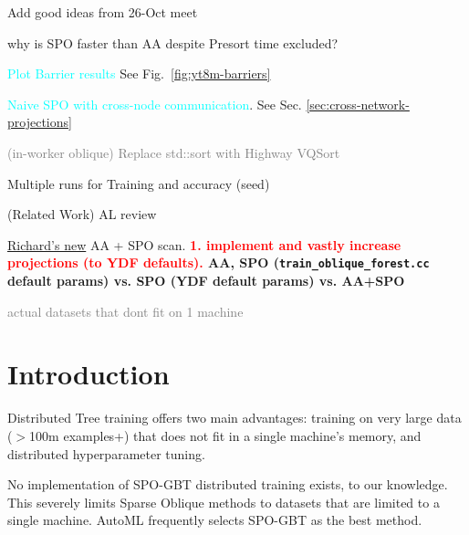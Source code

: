 \documentclass[sigconf,screen]{acmart}
\newcommand{\done}{\rlap{$\square$}{\raisebox{2pt}{\large\hspace{1pt}\checkmark}}\hspace{-2.5pt}}
\newcommand{\TODO}[1]{\textbf{\textcolor{red}{#1}}}
\begin{document}
\begin{todolist}
    \item Add good ideas from 26-Oct meet
    \item why is SPO faster than AA despite Presort time excluded?
    \item[\done] \textcolor{cyan}{Plot Barrier results} See Fig.~\ref{fig:yt8m-barriers}
    \begin{todolist}
        \item[\done] \textcolor{cyan}{Naive SPO with cross-node communication}. See Sec. \ref{sec:cross-network-projections}
    \end{todolist}
    \item[\done] \textcolor{gray}{(in-worker oblique) Replace std::sort with Highway VQSort}
    \item Multiple runs for Training and accuracy (seed)
    \item (Related Work) AL review
    \item \href{https://github.com/google/yggdrasil-decision-forests/commit/2fe3a7fae5a3e8646401cd98f5c0a2a9d5d81653}{Richard's new} AA + SPO scan. \TODO{1. implement and vastly increase projections (to YDF defaults). } \textbf{AA, SPO (\texttt{train\_oblique\_forest.cc} default params) vs. SPO (YDF default params) vs. AA+SPO}
    \item \textcolor{gray}{actual datasets that dont fit on 1 machine}
\end{todolist}


\section{Introduction}



Distributed Tree training offers two main advantages: training on very large data ($>$100m examples+) that does not fit in a single machine's memory, and distributed hyperparameter tuning. 

No implementation of SPO-GBT distributed training exists, to our knowledge. This severely limits Sparse Oblique methods to datasets that are limited to a single machine. AutoML frequently selects SPO-GBT as the best method.
\end{document}
